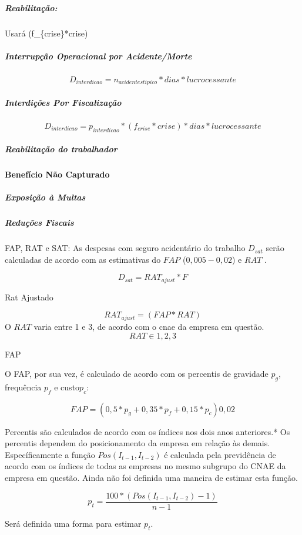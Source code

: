 \documentclass[]{article}
\let\oldparagraph\paragraph
\renewcommand{\paragraph}[1]{\oldparagraph{#1}\mbox{}}
\let\oldsubparagraph\subparagraph
\renewcommand{\subparagraph}[1]{\oldsubparagraph{#1}\mbox{}}
\begin{document}
\subparagraph{Reabilitação:}\label{reabilitacao}

Usará (f\_\{crise\}*crise)

\subparagraph{Interrupção Operacional por
Acidente/Morte}\label{interrupcao-operacional-por-acidentemorte}

\[D_{interdicao} = n_{acidentestipico} * dias * lucrocessante\]

\subparagraph{Interdições Por
Fiscalização}\label{interdicoes-por-fiscalizacao}

\[D_{interdicao} = p_{interdicao} * (f_{crise}*crise) * dias * lucrocessante \]

\subparagraph{Reabilitação do
trabalhador}\label{reabilitacao-do-trabalhador}

\paragraph{Benefício Não Capturado}\label{beneficio-nao-capturado}

\subparagraph{Exposição à Multas}\label{exposicao-a-multas}

\subparagraph{Reduções Fiscais}\label{reducoes-fiscais}

FAP, RAT e SAT: As despesas com seguro acidentário do trabalho
\(D_{sat}\) serão calculadas de acordo com as estimativas do \(FAP\)
(\(0,005 - 0,02\)) e \(RAT\) .

\[D_{sat} = RAT_{ajust}* F\]

Rat Ajustado

\[RAT_{ajust} = (FAP * RAT)\] O \(RAT\) varia entre 1 e 3, de acordo com
o cnae da empresa em questão. \[RAT \in {1,2,3}\]

FAP

O FAP, por sua vez, é calculado de acordo com os percentis de gravidade
\(p_g\), frequência \(p_{f}\) e custo\(p_c\):

\[FAP = (0,5*p_g + 0,35*p_{f}+0,15*p_c)0,02\]

Percentis são calculados de acordo com os índices nos dois anos
anteriores.* Os percentis dependem do posicionamento da empresa em
relação às demais. Específicamente a função \(Pos(I_{t-1},I_{t-2})\) é
calculada pela previdência de acordo com os índices de todas as empresas
no mesmo subgrupo do CNAE da empresa em questão. Ainda não foi definida
uma maneira de estimar esta função.

\[p_t = \frac{100*(Pos(I_{t-1},I_{t-2})-1)}{n-1}\]

Será definida uma forma para estimar \(p_t\).
\end{document}
